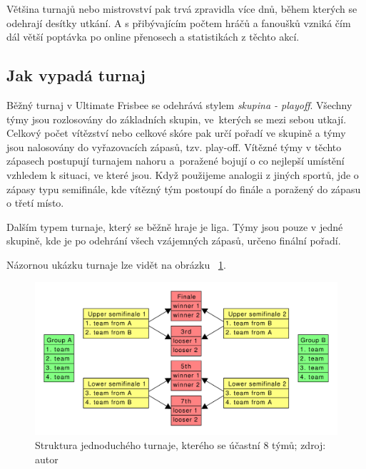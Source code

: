 Většina turnajů nebo mistrovství pak trvá zpravidla více dnů, během kterých se odehrají desítky
utkání. A s přibývajícím počtem hráčů a fanoušků vzniká čím dál větší poptávka po online
přenosech a statistikách z těchto akcí.

\subsection{Jak vypadá turnaj}

Běžný turnaj v Ultimate Frisbee se odehrává stylem \textit{skupina - playoff}. Všechny týmy jsou rozlosovány do základních skupin,
ve~kterých se mezi sebou utkají. Celkový počet vítězství nebo celkové skóre pak určí pořadí ve skupině a týmy
jsou nalosovány do vyřazovacích zápasů, tzv. play-off. Vítězné týmy v těchto zápasech postupují turnajem nahoru
a~poražené bojují o co nejlepší umístění vzhledem k situaci, ve které jsou. Když použijeme analogii z jiných sportů, jde o zápasy typu semifinále,
kde vítězný tým postoupí do finále a poražený do zápasu o třetí místo.

Dalším typem turnaje, který se běžně hraje je liga. Týmy jsou pouze v jedné skupině,
kde je po odehrání všech vzájemných zápasů, určeno finální pořadí.

Názornou ukázku turnaje lze vidět na obrázku ~\ref{fig:tournament}.

\begin{figure}[ht!]
\centering
\includegraphics[width=130mm]{./images/turnaj.pdf}
\caption{Struktura jednoduchého turnaje, kterého se účastní 8 týmů; zdroj: autor\label{overflow}}
\label{fig:tournament}
\end{figure}


